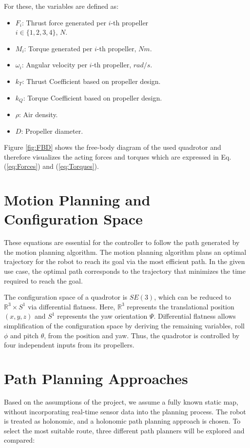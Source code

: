 \documentclass[a4paper, 11pt, conference]{ieeeconf}      %
\begin{document}
\noindent For these, the variables are defined as:
\begin{itemize}
    \item $F_i$: Thrust force generated per $i$-th propeller \\ $i \in \{1,2,3,4 \}$, $N$.
    \item $M_i$: Torque generated per $i$-th propeller, $Nm$.
    \item $\omega_i$: Angular velocity per $i$-th propeller, $rad/s$.
    \item $k_T$: Thrust Coefficient based on propeller design.
    \item $k_Q$: Torque Coefficient based on propeller design.
    \item $\rho$: Air density.
    \item $D$: Propeller diameter.
\end{itemize}

Figure \ref{fig:FBD} shows the free-body diagram of the used quadrotor and therefore visualizes the acting forces and torques which are expressed in Eq. (\ref{eq:Forces}) and (\ref{eq:Torques}).

\section{Motion Planning and Configuration Space}
These equations are essential for the controller to follow the path generated by the motion planning algorithm. The motion planning algorithm plans an optimal trajectory for the robot to reach its goal via the most efficient path. In the given use case, the optimal path corresponds to the trajectory that minimizes the time required to reach the goal.

The configuration space of a quadrotor is $SE(3)$, which can be reduced to $\mathbb{R}^3 \times S^1$ via differential flatness. Here, $\mathbb{R}^3$ represents the translational position $(x,y,z)$ and $S^1$ represents the yaw orientation $\Psi$. Differential flatness allows simplification of the configuration space by deriving the remaining variables, roll $\phi$ and pitch $\theta$, from the position and yaw. Thus, the quadrotor is controlled by four independent inputs from its propellers. 

\section{Path Planning Approaches}
Based on the assumptions of the project, we assume a fully known static map, without incorporating real-time sensor data into the planning process. The robot is treated as holonomic, and a holonomic path planning approach is chosen. To select the most suitable route, three different path planners will be explored and compared:
\end{document}
